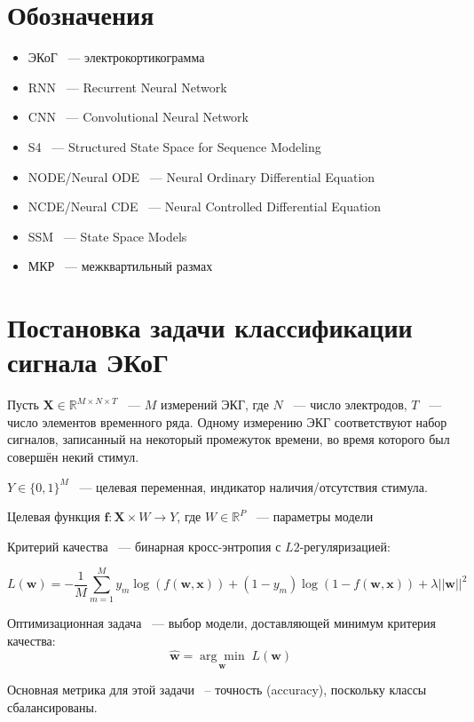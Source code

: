 \documentclass[a4paper, 12pt]{article}
\newcommand{\bx}{\mathbf{x}}
\newcommand{\bw}{\mathbf{w}}
\newcommand{\bff}{\mathbf{f}}
\newcommand{\bX}{\mathbf{X}}
\newcommand{\dR}{\mathds{R}}
\begin{document}
	\section{Обозначения}
	
	\begin{itemize}
		\item[] ЭКоГ ~--- электрокортикограмма
		\item[] RNN ~--- Recurrent Neural Network
		\item[] CNN ~--- Convolutional Neural Network
		\item[] S4 ~--- Structured State Space for Sequence Modeling
		\item[] NODE/Neural ODE ~--- Neural Ordinary Differential Equation
		\item[] NCDE/Neural CDE ~--- Neural Controlled Differential Equation
		\item[] SSM ~--- State Space Models
		\item[] МКР ~--- межквартильный размах
	\end{itemize}
	
	\section{Постановка задачи классификации сигнала ЭКоГ}
	
	Пусть $\bX \in \dR^{M \times N \times T}$ ~--- $M$ измерений ЭКГ, где $N$ ~--- число электродов, $T$ ~--- число элементов временного ряда. Одному измерению ЭКГ соответствуют набор сигналов, записанный на некоторый промежуток времени, во время которого был совершён некий стимул.
	
	$Y \in \{ 0, 1\}^M$ ~--- целевая переменная, индикатор наличия/отсутствия стимула.
	
	Целевая функция $ \bff: \bX \times W \to Y$, где $W \in \dR^P$ ~--- параметры модели
	
	Критерий качества ~--- бинарная кросс-энтропия с $L2$-регуляризацией:  
	
	$$ L(\bw) = -\dfrac{1}{M} \sum\limits_{m=1}^M y_m \log(f(\bw, \bx)) + (1 - y_m) \log(1 - f(\bw, \bx)) + \lambda ||\bw||^2$$
	
	Оптимизационная задача ~--- выбор модели, доставляющей минимум критерия качества: $$\hat{\bw} = \underset{\bw}{\arg \min} \; L(\bw)$$
	
	Основная метрика для этой задачи ~-- точность (accuracy), поскольку классы сбалансированы.
\end{document}
